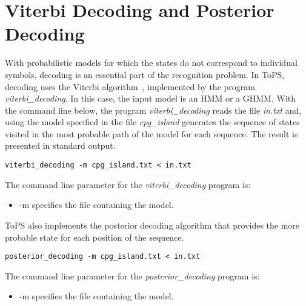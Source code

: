 

\section{Viterbi Decoding and Posterior Decoding}

With probabilistic models for which the states do not correspond to individual symbols, decoding is an essential part of the recognition problem. In ToPS, decoding uses the Viterbi algorithm~\cite{Rabiner1989}, implemented by the program \textit{viterbi\_decoding}. In this case, the input model is an HMM or a GHMM. With the command line below, the program \textit{viterbi\_decoding} reads the file \textit{in.txt} and, using the model specified in the file \textit{cpg\_island} generates the sequence of states visited in the most probable path of the model for each sequence. The result is presented in standard output.

\begin{Verbatim}[frame=single, label={Command line}]
viterbi_decoding -m cpg_island.txt < in.txt
\end{Verbatim}


The command line parameter for the \textit{viterbi\_decoding} program is:
\begin{itemize}
\item -m specifies the file containing the  model.
\end{itemize}


ToPS also implements the posterior decoding algorithm that provides the more probable state for each position of the sequence.


\begin{Verbatim}[frame=single, label={Command line}]
posterior_decoding -m cpg_island.txt < in.txt
\end{Verbatim}

The command line parameter for the \textit{posterior\_decoding} program is:
\begin{itemize}
\item -m specifies the file containing the  model.
\end{itemize}







